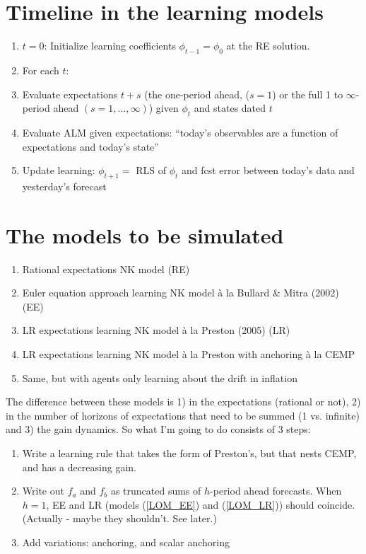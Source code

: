 \documentclass[11pt]{article}
\renewcommand{\[}{\begin{equation}}
\renewcommand{\]}{\end{equation}}
\begin{document}
\section{Timeline in the learning models}
\begin{enumerate}
\item[] \underline{$t=0$}: Initialize learning coefficients $\phi_{t-1} = \phi_0$ at the RE solution.
\item[] For each $t$:
\item Evaluate expectations $t+s$ (the one-period ahead, ($s=1$) or the full 1 to $\infty$-period ahead $(s=1,\dots, \infty)$) given $\phi_{t}$ and states dated $t$
\item Evaluate ALM given expectations: ``today's observables are a function of expectations and today's state''
\item Update learning: $\phi_{t+1}= $ RLS of $\phi_{t}$ and fcst error between today's data and yesterday's forecast
\end{enumerate}

\section{The models to be simulated}
\begin{enumerate}
\item Rational expectations NK model (RE)
\item Euler equation approach learning NK model \`a la Bullard \& Mitra (2002)  (EE)
\item LR expectations learning NK model \`a la Preston (2005)  (LR)
\item LR expectations learning NK model \`a la Preston with anchoring \`a la CEMP
\item Same, but with agents only learning about the drift in inflation
\end{enumerate}

The difference between these models is 1) in the expectations (rational or not), 2) in the number of horizons of expectations that need to be summed (1 vs. infinite) and 3) the gain dynamics. So what I'm going to do consists of 3 steps: 
\begin{enumerate}
\item Write a learning rule that takes the form of Preston's, but that nests CEMP, and has a decreasing gain.
\item Write out $f_a$ and $f_b$ as truncated sums of $h$-period ahead forecasts. When $h=1$, EE and LR (models (\ref{LOM_EE}) and (\ref{LOM_LR})) should coincide. (Actually - maybe they shouldn't. See later.)
\item Add variations: anchoring, and scalar anchoring
\end{enumerate}
\end{document}

